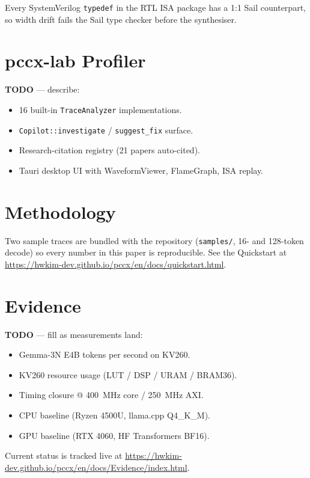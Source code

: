 \documentclass[11pt,a4paper]{article}
\begin{document}
Every SystemVerilog \texttt{typedef} in the RTL ISA package has a
1:1 Sail counterpart, so width drift fails the Sail type checker
before the synthesiser.

\section{pccx-lab Profiler}
\label{sec:lab}

\textbf{TODO} — describe:
\begin{itemize}
  \item 16 built-in \texttt{TraceAnalyzer} implementations.
  \item \texttt{Copilot::investigate} / \texttt{suggest\_fix} surface.
  \item Research-citation registry (21 papers auto-cited).
  \item Tauri desktop UI with WaveformViewer, FlameGraph, ISA replay.
\end{itemize}

\section{Methodology}
\label{sec:method}

Two sample traces are bundled with the repository
(\texttt{samples/}, 16- and 128-token decode) so every number in this
paper is reproducible.  See the Quickstart at
\url{https://hwkim-dev.github.io/pccx/en/docs/quickstart.html}.

\section{Evidence}
\label{sec:evidence}

\textbf{TODO} — fill as measurements land:
\begin{itemize}
  \item Gemma-3N E4B tokens per second on KV260.
  \item KV260 resource usage (LUT / DSP / URAM / BRAM36).
  \item Timing closure @ 400~MHz core / 250~MHz AXI.
  \item CPU baseline (Ryzen 4500U, llama.cpp Q4\_K\_M).
  \item GPU baseline (RTX 4060, HF Transformers BF16).
\end{itemize}

Current status is tracked live at
\url{https://hwkim-dev.github.io/pccx/en/docs/Evidence/index.html}.
\end{document}
